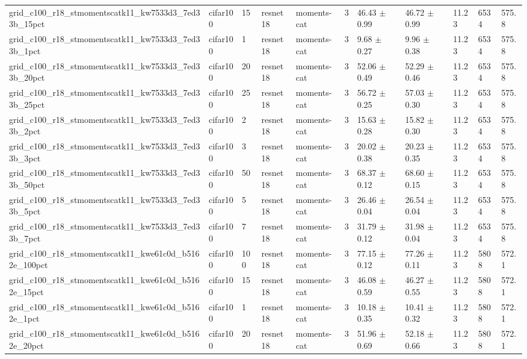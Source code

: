 \begin{tabular}{lllllllllll}
grid_c100_r18_stmomentscatk11_kw7533d3_7ed33b_15pct & cifar100 & 15 & resnet18 & moments-cat & 3 & 46.43 $\pm$ 0.99 & 46.72 $\pm$ 0.99 & 11.23 & 6534 & 575.8 \\
grid_c100_r18_stmomentscatk11_kw7533d3_7ed33b_1pct & cifar100 & 1 & resnet18 & moments-cat & 3 & 9.68 $\pm$ 0.27 & 9.96 $\pm$ 0.38 & 11.23 & 6534 & 575.8 \\
grid_c100_r18_stmomentscatk11_kw7533d3_7ed33b_20pct & cifar100 & 20 & resnet18 & moments-cat & 3 & 52.06 $\pm$ 0.49 & 52.29 $\pm$ 0.46 & 11.23 & 6534 & 575.8 \\
grid_c100_r18_stmomentscatk11_kw7533d3_7ed33b_25pct & cifar100 & 25 & resnet18 & moments-cat & 3 & 56.72 $\pm$ 0.25 & 57.03 $\pm$ 0.30 & 11.23 & 6534 & 575.8 \\
grid_c100_r18_stmomentscatk11_kw7533d3_7ed33b_2pct & cifar100 & 2 & resnet18 & moments-cat & 3 & 15.63 $\pm$ 0.28 & 15.82 $\pm$ 0.30 & 11.23 & 6534 & 575.8 \\
grid_c100_r18_stmomentscatk11_kw7533d3_7ed33b_3pct & cifar100 & 3 & resnet18 & moments-cat & 3 & 20.02 $\pm$ 0.38 & 20.23 $\pm$ 0.35 & 11.23 & 6534 & 575.8 \\
grid_c100_r18_stmomentscatk11_kw7533d3_7ed33b_50pct & cifar100 & 50 & resnet18 & moments-cat & 3 & 68.37 $\pm$ 0.12 & 68.60 $\pm$ 0.15 & 11.23 & 6534 & 575.8 \\
grid_c100_r18_stmomentscatk11_kw7533d3_7ed33b_5pct & cifar100 & 5 & resnet18 & moments-cat & 3 & 26.46 $\pm$ 0.04 & 26.54 $\pm$ 0.04 & 11.23 & 6534 & 575.8 \\
grid_c100_r18_stmomentscatk11_kw7533d3_7ed33b_7pct & cifar100 & 7 & resnet18 & moments-cat & 3 & 31.79 $\pm$ 0.12 & 31.98 $\pm$ 0.04 & 11.23 & 6534 & 575.8 \\
grid_c100_r18_stmomentscatk11_kwe61c0d_b5162e_100pct & cifar100 & 100 & resnet18 & moments-cat & 3 & 77.15 $\pm$ 0.12 & 77.26 $\pm$ 0.11 & 11.23 & 5808 & 572.1 \\
grid_c100_r18_stmomentscatk11_kwe61c0d_b5162e_15pct & cifar100 & 15 & resnet18 & moments-cat & 3 & 46.08 $\pm$ 0.59 & 46.27 $\pm$ 0.55 & 11.23 & 5808 & 572.1 \\
grid_c100_r18_stmomentscatk11_kwe61c0d_b5162e_1pct & cifar100 & 1 & resnet18 & moments-cat & 3 & 10.18 $\pm$ 0.35 & 10.41 $\pm$ 0.32 & 11.23 & 5808 & 572.1 \\
grid_c100_r18_stmomentscatk11_kwe61c0d_b5162e_20pct & cifar100 & 20 & resnet18 & moments-cat & 3 & 51.96 $\pm$ 0.69 & 52.18 $\pm$ 0.66 & 11.23 & 5808 & 572.1 \\

\end{tabular}
